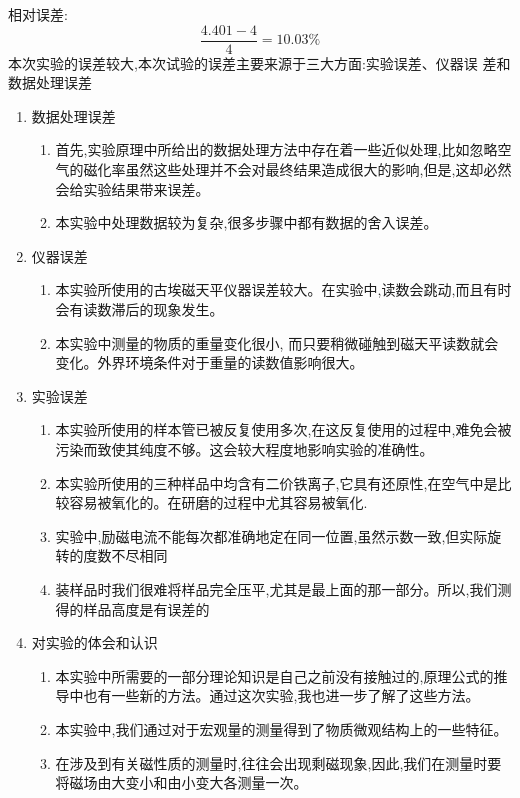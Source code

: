 \documentclass[11pt]{report}
\begin{document}
\begin{enumerate}
相对误差:
\[
\frac{4.401-4}{4}=10.03\%
\]
本次实验的误差较大,本次试验的误差主要来源于三大方面:实验误差、仪器误
差和数据处理误差
\begin{enumerate}
\item 数据处理误差
\label{sec:org4f7e6f5}
\begin{enumerate}
\item 首先,实验原理中所给出的数据处理方法中存在着一些近似处理,比如忽略空气的磁化率虽然这些处理并不会对最终结果造成很大的影响,但是,这却必然会给实验结果带来误差。
\item 本实验中处理数据较为复杂,很多步骤中都有数据的舍入误差。
\end{enumerate}
\item 仪器误差
\label{sec:org326f408}
\begin{enumerate}
\item 本实验所使用的古埃磁天平仪器误差较大。在实验中,读数会跳动,而且有时会有读数滞后的现象发生。
\item 本实验中测量的物质的重量变化很小, 而只要稍微碰触到磁天平读数就会变化。外界环境条件对于重量的读数值影响很大。
\end{enumerate}
\item 实验误差
\label{sec:orgafbf3f3}
\begin{enumerate}
\item 本实验所使用的样本管已被反复使用多次,在这反复使用的过程中,难免会被污染而致使其纯度不够。这会较大程度地影响实验的准确性。
\item 本实验所使用的三种样品中均含有二价铁离子,它具有还原性,在空气中是比较容易被氧化的。在研磨的过程中尤其容易被氧化.
\item 实验中,励磁电流不能每次都准确地定在同一位置,虽然示数一致,但实际旋转的度数不尽相同
\item 装样品时我们很难将样品完全压平,尤其是最上面的那一部分。所以,我们测得的样品高度是有误差的
\end{enumerate}
\item 对实验的体会和认识
\label{sec:orgdf998e0}
\begin{enumerate}
\item 本实验中所需要的一部分理论知识是自己之前没有接触过的,原理公式的推导中也有一些新的方法。通过这次实验,我也进一步了解了这些方法。
\item 本实验中,我们通过对于宏观量的测量得到了物质微观结构上的一些特征。
\item 在涉及到有关磁性质的测量时,往往会出现剩磁现象,因此,我们在测量时要将磁场由大变小和由小变大各测量一次。
\end{enumerate}
\end{enumerate}
\end{enumerate}
\end{document}
